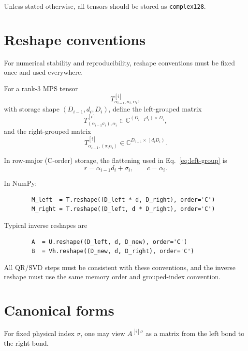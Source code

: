 \documentclass[aps,prb,onecolumn,nofootinbib]{revtex4-2}
\begin{document}
	Unless stated otherwise, all tensors should be stored as \texttt{complex128}.
	
	\section{Reshape conventions}
	\label{sec:reshape}
	
	For numerical stability and reproducibility, reshape conventions must be fixed once and used everywhere.
	
	For a rank-3 MPS tensor
	\[
	T^{[i]}_{\alpha_{i-1},\sigma_i,\alpha_i},
	\]
	with storage shape $(D_{i-1},d_i,D_i)$, define the left-grouped matrix
	\begin{equation}
		T^{[i]}_{(\alpha_{i-1}\sigma_i),\alpha_i}
		\in \mathbb{C}^{(D_{i-1}d_i)\times D_i},
		\label{eq:left-group}
	\end{equation}
	and the right-grouped matrix
	\begin{equation}
		T^{[i]}_{\alpha_{i-1},(\sigma_i\alpha_i)}
		\in \mathbb{C}^{D_{i-1}\times(d_iD_i)}.
		\label{eq:right-group}
	\end{equation}
	
	In row-major (C-order) storage, the flattening used in Eq.~\eqref{eq:left-group} is
	\begin{equation}
		r = \alpha_{i-1} d_i + \sigma_i,\qquad c = \alpha_i.
	\end{equation}
	
	In NumPy:
	\begin{verbatim}
		M_left  = T.reshape((D_left * d, D_right), order='C')
		M_right = T.reshape((D_left, d * D_right), order='C')
	\end{verbatim}
	
	Typical inverse reshapes are
	\begin{verbatim}
		A  = U.reshape((D_left, d, D_new), order='C')
		B  = Vh.reshape((D_new, d, D_right), order='C')
	\end{verbatim}
	
	All QR/SVD steps must be consistent with these conventions, and the inverse reshape must use the same memory order and grouped-index convention.
	
	\section{Canonical forms}
	
	For fixed physical index $\sigma$, one may view $A^{[i]\sigma}$ as a matrix from the left bond to the right bond.
	
\end{document}
